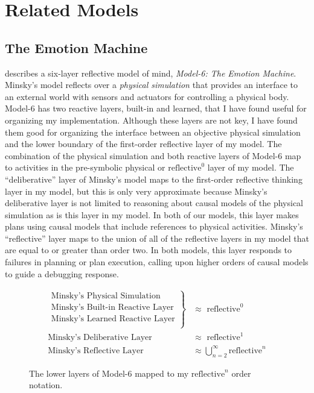 \chapter{Related Models}
\label{chapter:related_models}

\section{The Emotion Machine}
\label{backreference:self_reflective_self_conscious}

\cite{minsky:2006} describes a six-layer reflective model of mind,
\emph{{\mbox{Model-6}}: The Emotion Machine}.  Minsky's model reflects
over a \emph{physical simulation} that provides an interface to an
external world with sensors and actuators for controlling a physical
body.  {\mbox{Model-6}} has two reactive layers, built-in and learned,
that I have found useful for organizing my implementation.  Although
these layers are not key, I have found them good for organizing the
interface between an objective physical simulation and the lower
boundary of the first-order reflective layer of my model.  The
combination of the physical simulation and both reactive layers of
{\mbox{Model-6}} map to activities in the pre-symbolic physical or
$\text{reflective}^0$ layer of my model.  The ``deliberative'' layer
of Minsky's model maps to the first-order reflective thinking layer in
my model, but this is only very approximate because Minsky's
deliberative layer is not limited to reasoning about causal models of
the physical simulation as is this layer in my model.  In both of our
models, this layer makes plans using causal models that include
references to physical activities.  Minsky's ``reflective'' layer maps
to the union of all of the reflective layers in my model that are
equal to or greater than order two.  In both models, this layer
responds to failures in planning or plan execution, calling upon
higher orders of causal models to guide a debugging response.

\begin{figure}[bth]
\begin{align*}
\left.
  \begin{array}{l}
    \text{Minsky's Physical Simulation}\\
    \text{Minsky's Built-in Reactive Layer}\\
    \text{Minsky's Learned Reactive Layer}\\
  \end{array}
\right\}                            &{\approx} \text{ reflective}^0 \\
\text{Minsky's Deliberative Layer } &{\approx} \text{ reflective}^1 \\
\text{Minsky's Reflective Layer }   &{\approx} \bigcup_{n=2}^{\infty}{\text{reflective}^n}
\end{align*}
\caption{The lower layers of Model-6 mapped to my
  $\text{reflective}^n$ order notation.}
\label{figure:model_6_as_reflective_order_notation}
\end{figure}

